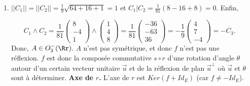 {{\begin{enumerate}
$$AX=X\Leftrightarrow\left\{
\begin{array}{l}
-x+y+\sqrt{6}z=0\\
x-y-\sqrt{6}z=0\\
-\sqrt{6}x+\sqrt{6}y-2z=0
\end{array}
\right.\Leftrightarrow x-y=\sqrt{6}z=\frac{2}{\sqrt{6}}z\Leftrightarrow x=y\;\mbox{et}\;z=0.$$ 
L'axe $D$ de $f$ est $\mbox{Vect}(\overrightarrow{u})$ où $\overrightarrow{u}=(1,1,0)$. $D$ est dorénavant orienté par $\overrightarrow{u}$.
\textbf{Angle de $f$.} $\overrightarrow{k}=[0,0,1)$ est un vecteur unitaire orthogonal à $\overrightarrow{u}$. Par suite,

$$\cos\theta=\overrightarrow{k}.f(\overrightarrow{k})=(0,0,1).\frac{1}{4}(\sqrt{6},-\sqrt{6},2)=\frac{1}{2},$$
et donc $\cos\theta=\pm\frac{\pi}{3}\;(2\pi)$. Le signe de $\sin\theta$ est le signe de $\left[\overrightarrow{i},f(\overrightarrow{i}),\overrightarrow{u}\right]
=\left|
\begin{array}{ccc}
1&3/4&1\\
0&1/4&1\\
0&-\sqrt{6}/4&0
\end{array}
\right|=\frac{1}{\sqrt{6}}>0$. Donc, 

\begin{center}
\end{center}
 \item  $||C_1||=||C_2||=\frac{1}{9}\sqrt{64+16+1}=1$ et $C_1|C_2=\frac{1}{81}(8-16+8)=0$. Enfin,

$$C_1\wedge C_2=\frac{1}{81}\left(
\begin{array}{c}
8\\
-4\\
1
\end{array}
\right)\wedge\left(
\begin{array}{c}
1\\
4\\
8
\end{array}
\right)=\frac{1}{81}\left(
\begin{array}{c}
-36\\
-63\\
36
\end{array}
\right)=-\frac{1}{9}\left(
\begin{array}{c}
4\\
7\\
-4
\end{array}
\right)=-C_3.$$
Donc, $A\in O_3^-(\Rr)$. $A$ n'est pas symétrique, et donc $f$ n'est pas une réflexion. $f$ est donc la composée commutative $s\circ r$ d'une rotation d'angle $\theta$ autour d'un certain vecteur unitaire $\overrightarrow{u}$ et de la réflexion de plan $\overrightarrow{u}^\bot$ où $\overrightarrow{u}$ et $\theta$ sont à déterminer.
\textbf{Axe de $r$.} L'axe de $r$ est $Ker(f+Id_E)$ (car $f\neq-Id_E$).


\end{enumerate}}}

